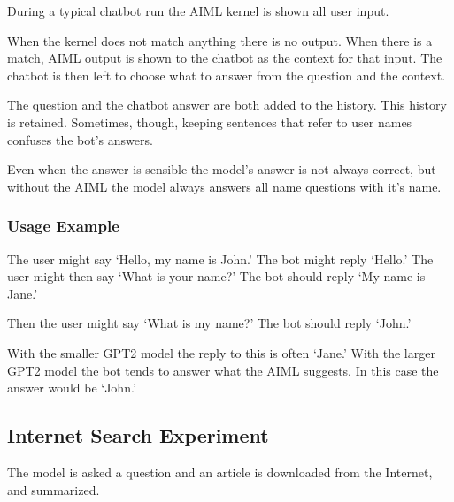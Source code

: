 During a typical chatbot run the AIML kernel is shown all user input.%

When the kernel does not match anything there is no output. When there is a match, AIML output is shown to the chatbot as the context for that input. 
The chatbot is then left to choose what to answer from the question and the context. 

The question and the chatbot answer are both added to the history. 
This history is retained. 
Sometimes, though, keeping sentences that refer to user names confuses the bot's answers.%

Even when the answer is sensible the model's answer is not always correct, but without the AIML the model always answers all name questions with it's name. 


\subsubsection{Usage Example}

The user might say `Hello, my name is John.' The bot might reply `Hello.' The user might then say `What is your name?' The bot should reply `My name is Jane.'

Then the user might say `What is my name?' The bot should reply `John.'

With the smaller GPT2 model the reply to this is often `Jane.' %
With the larger GPT2 model the bot tends to answer what the AIML suggests. In this case the answer would be `John.'

\subsection{Internet Search Experiment}
The model is asked a question and an article is downloaded from the Internet, and summarized. %

